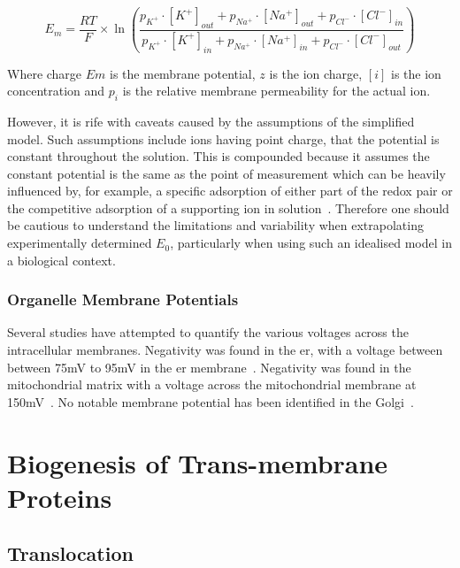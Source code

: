 \begin{equation}
{{E}_{m}}=\frac{RT}{F} \times{\ln}
  \left(\frac{
    {p}_{K^+}\cdot{[K^+]}_{out} + {p}_{Na^+}\cdot{[Na^+]}_{out} + {p}_{Cl^-}\cdot{[Cl^-]}_{in}}
    {{p}_{K^+}\cdot{[K^+]}_{in} + {p}_{Na^+}\cdot{[Na^+]}_{in} + {p}_{Cl^-}\cdot{[Cl^-]}_{out}
    }\right)
\end{equation}

Where charge $Em$ is the membrane potential, $z$ is the ion charge, $[i]$ is the ion concentration and ${p}_{i}$ is the relative membrane permeability for the actual ion.

However, it is rife with caveats caused by the assumptions of the simplified model. Such assumptions include ions having point charge, that the potential is constant throughout the solution. This is compounded because it assumes the constant potential is the same as the point of measurement which can be heavily influenced by, for example, a specific adsorption of either part of the redox pair or the competitive adsorption of a supporting ion in solution~\cite{Feiner1994}. Therefore one should be cautious to understand the limitations and variability when extrapolating experimentally determined ${E}_{0}$, particularly when using such an idealised model in a biological context.

\subsubsection{Organelle Membrane Potentials}

Several studies have attempted to quantify the various voltages across the intracellular membranes. Negativity was found in the \gls{er}, with a voltage between between 75mV to 95mV in the \gls{er} membrane~\cite{Qin2011, Worley1994}. Negativity was found in the mitochondrial matrix with a  voltage across the mitochondrial membrane at 150mV~\cite{Perry2011}. No notable membrane potential has been identified in the Golgi~\cite{Schapiro2000, Llopis1998}.

\section{Biogenesis of Trans-membrane Proteins}
\subsection{Translocation}


